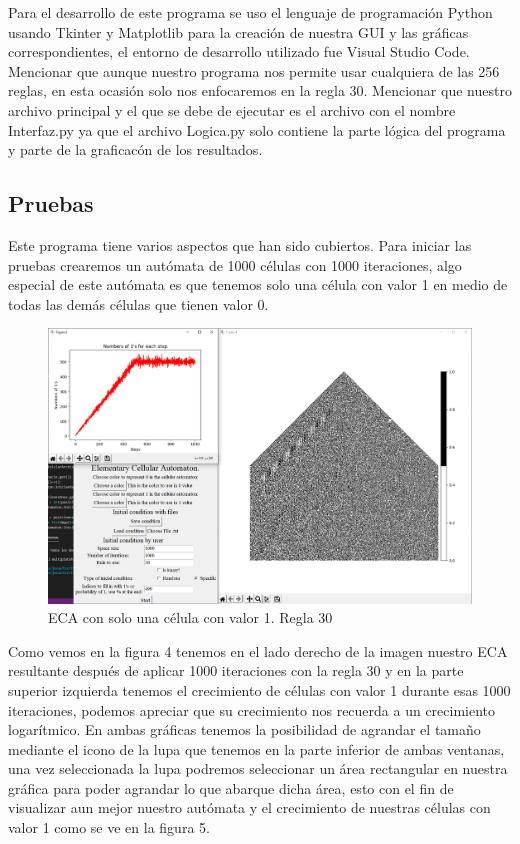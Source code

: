 \documentclass[11pt]{article}
\begin{document}
		Para el desarrollo de este programa se uso el lenguaje de programación Python usando Tkinter y Matplotlib para la creación de nuestra GUI y las gráficas correspondientes, el entorno de desarrollo utilizado fue Visual Studio Code. Mencionar que aunque nuestro programa nos permite usar cualquiera de las 256 reglas, en esta ocasión solo nos enfocaremos en la regla 30. Mencionar que nuestro archivo principal y el que se debe de ejecutar es el archivo con el nombre Interfaz.py ya que el archivo Logica.py solo contiene la parte lógica del programa y parte de la graficacón de los resultados.
		\newpage
		\subsection{Pruebas}
		Este programa tiene varios aspectos que han sido cubiertos. Para iniciar las pruebas
crearemos un autómata de 1000 células con 1000 iteraciones, algo especial de este autómata es que tenemos solo una célula con valor 1 en medio de todas las demás células que tienen valor 0.
		\begin{figure}[H]
			\centering
			\includegraphics[scale=0.42]{resources/prueba1.png}
			\caption{ECA con solo una célula con valor 1. Regla 30}\label{fig:picture}
		\end{figure}
		Como vemos en la figura 4 tenemos en el lado derecho de la imagen nuestro ECA resultante después de aplicar 1000 iteraciones con la regla 30 y en la parte superior izquierda tenemos el crecimiento de células con valor 1 durante esas 1000 iteraciones, podemos apreciar que su crecimiento nos recuerda a un crecimiento logarítmico. En ambas gráficas tenemos la posibilidad de agrandar el tamaño mediante el icono de la lupa que tenemos en la parte inferior de ambas ventanas, una vez seleccionada la lupa podremos seleccionar un área rectangular en nuestra gráfica para poder agrandar lo que abarque dicha área, esto con el fin de visualizar aun mejor nuestro autómata y el crecimiento de nuestras células con valor 1 como se ve en la figura 5.
\end{document}

